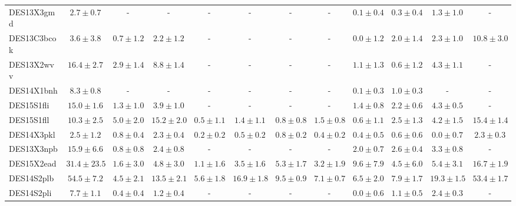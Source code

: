 \documentclass[fleqn,usenatbib,]{mnras}
\begin{document}
\begin{table}
\begin{tabular}{lccccccccccc}
DES13X3gmd  &    $2.7 \pm 0.7$ &              - &               - &              - &               - &              - &              - &  $0.1 \pm 0.4$ &   $0.3 \pm 0.4$ &   $1.3 \pm 1.0$ &               - \\
DES13C3bcok &    $3.6 \pm 3.8$ &  $0.7 \pm 1.2$ &   $2.2 \pm 1.2$ &              - &               - &              - &              - &  $0.0 \pm 1.2$ &   $2.0 \pm 1.4$ &   $2.3 \pm 1.0$ &  $10.8 \pm 3.0$ \\
DES13X2wvv  &   $16.4 \pm 2.7$ &  $2.9 \pm 1.4$ &   $8.8 \pm 1.4$ &              - &               - &              - &              - &  $1.1 \pm 1.3$ &   $0.6 \pm 1.2$ &   $4.3 \pm 1.1$ &               - \\
DES14X1bnh  &    $8.3 \pm 0.8$ &              - &               - &              - &               - &              - &              - &  $0.1 \pm 0.3$ &   $1.0 \pm 0.3$ &               - &               - \\
DES15S1fli  &   $15.0 \pm 1.6$ &  $1.3 \pm 1.0$ &   $3.9 \pm 1.0$ &              - &               - &              - &              - &  $1.4 \pm 0.8$ &   $2.2 \pm 0.6$ &   $4.3 \pm 0.5$ &               - \\
DES15S1fll  &   $10.3 \pm 2.5$ &  $5.0 \pm 2.0$ &  $15.2 \pm 2.0$ &  $0.5 \pm 1.1$ &   $1.4 \pm 1.1$ &  $0.8 \pm 0.8$ &  $1.5 \pm 0.8$ &  $0.6 \pm 1.1$ &   $2.5 \pm 1.3$ &   $4.2 \pm 1.5$ &  $15.4 \pm 1.4$ \\
DES14X3pkl  &    $2.5 \pm 1.2$ &  $0.8 \pm 0.4$ &   $2.3 \pm 0.4$ &  $0.2 \pm 0.2$ &   $0.5 \pm 0.2$ &  $0.8 \pm 0.2$ &  $0.4 \pm 0.2$ &  $0.4 \pm 0.5$ &   $0.6 \pm 0.6$ &   $0.0 \pm 0.7$ &   $2.3 \pm 0.3$ \\
DES13X3npb  &   $15.9 \pm 6.6$ &  $0.8 \pm 0.8$ &   $2.4 \pm 0.8$ &              - &               - &              - &              - &  $2.0 \pm 0.7$ &   $2.6 \pm 0.4$ &   $3.3 \pm 0.8$ &               - \\
DES15X2ead  &  $31.4 \pm 23.5$ &  $1.6 \pm 3.0$ &   $4.8 \pm 3.0$ &  $1.1 \pm 1.6$ &   $3.5 \pm 1.6$ &  $5.3 \pm 1.7$ &  $3.2 \pm 1.9$ &  $9.6 \pm 7.9$ &   $4.5 \pm 6.0$ &   $5.4 \pm 3.1$ &  $16.7 \pm 1.9$ \\
DES14S2plb  &   $54.5 \pm 7.2$ &  $4.5 \pm 2.1$ &  $13.5 \pm 2.1$ &  $5.6 \pm 1.8$ &  $16.9 \pm 1.8$ &  $9.5 \pm 0.9$ &  $7.1 \pm 0.7$ &  $6.5 \pm 2.0$ &   $7.9 \pm 1.7$ &  $19.3 \pm 1.5$ &  $53.4 \pm 1.7$ \\
DES14S2pli  &    $7.7 \pm 1.1$ &  $0.4 \pm 0.4$ &   $1.2 \pm 0.4$ &              - &               - &              - &              - &  $0.0 \pm 0.6$ &   $1.1 \pm 0.5$ &   $2.4 \pm 0.3$ &               - \\

\end{tabular}
\end{table}
\end{document}
